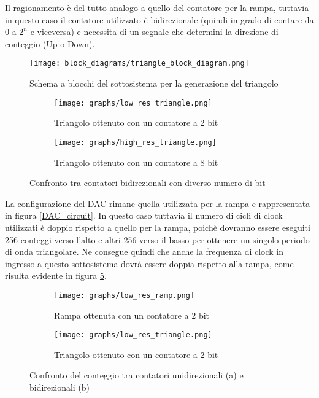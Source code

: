
Il ragionamento è del tutto analogo a quello del contatore per la rampa, tuttavia in questo
caso il contatore utilizzato è bidirezionale (quindi in grado di contare da $0$ a $2^n$ e
viceversa) e necessita di un segnale che determini la direzione di conteggio (Up o Down).

\begin{figure}[H]
    \centering
    \texttt{[image: block\_diagrams/triangle\_block\_diagram.png]}
    \caption{Schema a blocchi del sottosistema per la generazione del triangolo}
    \label{triangle_block_diagram}
\end{figure}

\begin{figure}[H]
    \centering

    \begin{subfigure}{.5\textwidth}
        \centering
        \texttt{[image: graphs/low\_res\_triangle.png]}
        \caption{Triangolo ottenuto con un contatore a 2 bit}
        \label{low_res_triangle}
    \end{subfigure}%
    \begin{subfigure}{.5\textwidth}
        \centering
        \texttt{[image: graphs/high\_res\_triangle.png]}
        \caption{Triangolo ottenuto con un contatore a 8 bit}
        \label{high_res_triangle}
    \end{subfigure}

    \caption{Confronto tra contatori bidirezionali con diverso numero di bit}
    \label{triangles}
\end{figure}

La configurazione del DAC rimane quella utilizzata per la rampa e rappresentata in figura
\ref{DAC_circuit}. In questo caso tuttavia il numero di cicli di clock utilizzati è doppio
rispetto a quello per la rampa, poichè dovranno essere eseguiti 256 conteggi verso l'alto
e altri 256 verso il basso per ottenere un singolo periodo di onda triangolare. Ne
consegue quindi che anche la frequenza di clock in ingresso a questo sottosistema dovrà
essere doppia rispetto alla rampa, come risulta evidente in figura \ref{steps}.

\begin{figure}[H]
    \centering

    \begin{subfigure}{.5\textwidth}
        \centering
        \texttt{[image: graphs/low\_res\_ramp.png]}
        \caption{Rampa ottenuta con un contatore a 2 bit}
    \end{subfigure}%
    \begin{subfigure}{.5\textwidth}
        \centering
        \texttt{[image: graphs/low\_res\_triangle.png]}
        \caption{Triangolo ottenuto con un contatore a 2 bit}
    \end{subfigure}

    \caption{Confronto del conteggio tra contatori unidirezionali (a) e bidirezionali (b)}
    \label{steps}
\end{figure}

